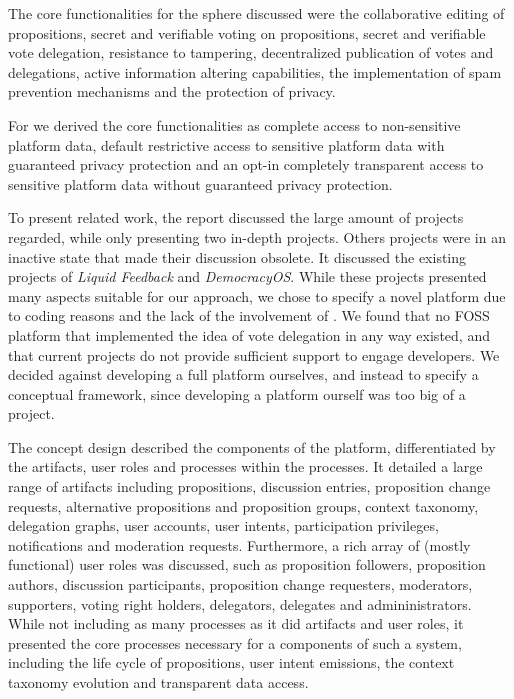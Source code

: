 The core functionalities for the  sphere discussed were the collaborative editing of propositions, secret and verifiable voting on propositions, secret and verifiable vote delegation, resistance to tampering, decentralized publication of votes and delegations, active information altering capabilities, the implementation of spam prevention mechanisms and the protection of
privacy.

For  we derived the core functionalities as complete access to non-sensitive platform data, default restrictive access to sensitive platform data with guaranteed privacy protection and an opt-in completely transparent access to sensitive platform data without guaranteed privacy protection.

To present related work, the report discussed the large amount of projects regarded, while only presenting two in-depth projects. Others projects were in an inactive state that made their discussion obsolete. It discussed the existing projects of \textit{Liquid Feedback} and \textit{DemocracyOS}. While these projects presented many aspects suitable for our approach, we chose to specify a novel platform due to coding reasons and the lack of the involvement of . We found that no FOSS platform that implemented the idea of vote delegation in any way existed, and that current projects do not provide sufficient support to engage developers. We decided against developing a full platform ourselves, and instead to specify a conceptual framework, since developing a platform ourself was too big of a project.

The concept design described the components of the platform, differentiated by the artifacts, user roles and processes within the processes. It detailed a large range of artifacts including propositions, discussion entries, proposition change requests, alternative propositions and proposition groups, context taxonomy, delegation graphs, user accounts, user intents, participation privileges, notifications and moderation requests. 
Furthermore, a rich array of (mostly functional) user roles was discussed, such as proposition followers, proposition authors, discussion participants, proposition change requesters, moderators, supporters, voting right holders, delegators, delegates and admininistrators. 
While not including as many processes as it did artifacts and user roles, it presented the core processes necessary for a  components of such a system, including the life cycle of propositions, user intent emissions, the context taxonomy evolution and transparent data access.

